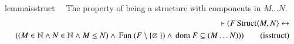 \begin{restatable}{lemma}{isstruct}~~ The property of being a structure with
components in $M \ldots N$.
     ~
\begin{align}
\vdash ( F \,\mathrm{Struct} \langle M , N \rangle \leftrightarrow \notag \\
( ( M \in
    \mathbb{N} \wedge N \in \mathbb{N} \wedge M \le N ) \wedge \,\mathrm{Fun}~ (
    F \setminus \{ \varnothing~ \} ) \wedge \,\mathrm{dom}~ F \subseteq ( M
    \ldots N ) ) )\label{eq:isstruct}\tag{isstruct}
\end{align}
\end{restatable}

